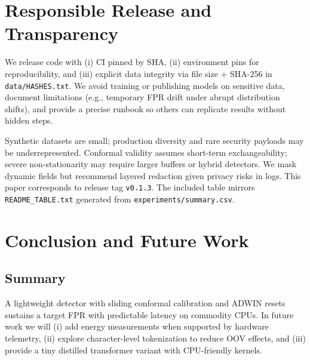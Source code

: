 \documentclass[10pt,twocolumn]{article}
\begin{document}
\section{Responsible Release and Transparency}
We release code with (i) CI pinned by SHA, (ii) environment pins for reproducibility, and (iii) explicit data integrity via file size + SHA-256 in \texttt{data/HASHES.txt}. We avoid training or publishing models on sensitive data, document limitations (e.g., temporary FPR drift under abrupt distribution shifts), and provide a precise runbook so others can replicate results without hidden steps.

Synthetic datasets are small; production diversity and rare security payloads may be underrepresented. Conformal validity assumes short-term exchangeability; severe non-stationarity may require larger buffers or hybrid detectors. We mask dynamic fields but recommend layered redaction given privacy risks in logs.
This paper corresponds to release tag \texttt{v0.1.3}.
The included table mirrors \texttt{README\_TABLE.txt} generated from \texttt{experiments/summary.csv}.
\section{Conclusion and Future Work}
\subsection*{Summary}
A lightweight detector with sliding conformal calibration and ADWIN resets sustains a target FPR with predictable latency on commodity CPUs. In future work we will (i) add energy measurements when supported by hardware telemetry, (ii) explore character-level tokenization to reduce OOV effects, and (iii) provide a tiny distilled transformer variant with CPU-friendly kernels.


\balance

\end{document}
